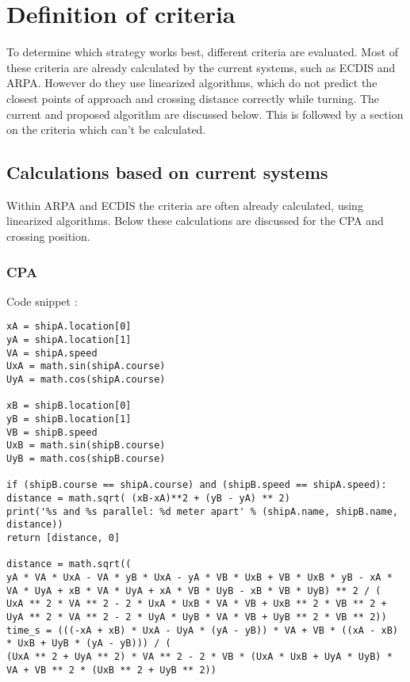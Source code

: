 \chapter{Definition of criteria}
To determine which strategy works best, different criteria are evaluated. Most of these criteria are already calculated by the current systems, such as \ac{ECDIS} and \ac{ARPA}. However do they use linearized algorithms, which do not predict the closest points of approach and crossing distance correctly while turning. The current and proposed algorithm are discussed below. This is followed by a section on the criteria which can't be calculated.

\section{Calculations based on current systems}
Within \ac{ARPA} and \ac{ECDIS} the criteria are often already calculated, using linearized algorithms. Below these calculations are discussed for the \ac{CPA} and crossing position.

\subsection{\ac{CPA}}
Code snippet :
\begin{lstlisting}
xA = shipA.location[0]
yA = shipA.location[1]
VA = shipA.speed
UxA = math.sin(shipA.course)
UyA = math.cos(shipA.course)

xB = shipB.location[0]
yB = shipB.location[1]
VB = shipB.speed
UxB = math.sin(shipB.course)
UyB = math.cos(shipB.course)

if (shipB.course == shipA.course) and (shipB.speed == shipA.speed):
distance = math.sqrt( (xB-xA)**2 + (yB - yA) ** 2)
print('%s and %s parallel: %d meter apart' % (shipA.name, shipB.name, distance))
return [distance, 0]

distance = math.sqrt((
yA * VA * UxA - VA * yB * UxA - yA * VB * UxB + VB * UxB * yB - xA * VA * UyA + xB * VA * UyA + xA * VB * UyB - xB * VB * UyB) ** 2 / (
UxA ** 2 * VA ** 2 - 2 * UxA * UxB * VA * VB + UxB ** 2 * VB ** 2 + UyA ** 2 * VA ** 2 - 2 * UyA * UyB * VA * VB + UyB ** 2 * VB ** 2))
time_s = (((-xA + xB) * UxA - UyA * (yA - yB)) * VA + VB * ((xA - xB) * UxB + UyB * (yA - yB))) / (
(UxA ** 2 + UyA ** 2) * VA ** 2 - 2 * VB * (UxA * UxB + UyA * UyB) * VA + VB ** 2 * (UxB ** 2 + UyB ** 2))
\end{lstlisting}

